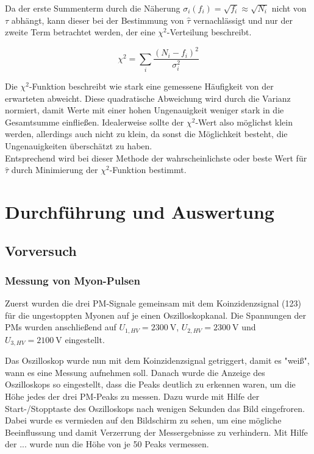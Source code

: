 \documentclass[slug=LM, room=Andreas-Schubert-Bau\,\ K\ 1A, supervisor=Anne-Sophie\ Berthold, coursedate=13.\ 12.\ 2019]{../../Lab_Report_LaTeX/lab_report}
\begin{document}
Da der erste Summenterm durch die Näherung \(\sigma_i(f_i) = \sqrt{f_i} \approx \sqrt{N_i}\) nicht
von \(\tau\) abhängt, kann dieser bei der Bestimmung von \(\hat{\tau}\) vernachlässigt und nur
der zweite Term betrachtet werden, der eine \(\chi^2\)-Verteilung beschreibt.

\begin{equation}\label{eq:chi}
 \chi^2 = \sum_{i} \frac{(N_i - f_i)^2}{\sigma_i^2}
\end{equation}

Die \(\chi^2\)-Funktion beschreibt wie stark eine gemessene Häufigkeit von der erwarteten abweicht.
Diese quadratische Abweichung wird durch die Varianz normiert, damit Werte mit einer hohen
Ungenauigkeit weniger stark in die Gesamtsumme einfließen. Idealerweise sollte der \(\chi^2\)-Wert
also möglichst klein werden, allerdings auch nicht zu klein, da sonst die Möglichkeit besteht, die
Ungenauigkeiten überschätzt zu haben.\\

Entsprechend wird bei dieser Methode der wahrscheinlichste oder beste Wert für \(\hat\tau\) durch
Minimierung der \(\chi^2\)-Funktion bestimmt.

\section{Durchf\"uhrung und Auswertung}
\label{sec:durchaus}

\subsection{Vorversuch}
\label{sec:vorvers}

\subsubsection{Messung von Myon-Pulsen}
\label{sec:pulse}

Zuerst wurden die drei PM-Signale gemeinsam mit dem Koinzidenzsignal
(123) für die ungestoppten Myonen auf je einen Oszilloskopkanal. Die
Spannungen der PMs wurden anschließend auf
\(U_{1,HV} = \SI{2300}{\volt}\), \(U_{2,HV} = \SI{2300}{\volt}\) und
\(U_{3,HV} = \SI{2100}{\volt}\) eingestellt.

Das Oszilloskop wurde nun mit dem Koinzidenzsignal getriggert, damit
es "weiß", wann es eine Messung aufnehmen soll.  Danach wurde die
Anzeige des Oszilloskops so eingestellt, dass die Peaks deutlich zu
erkennen waren, um die Höhe jedes der drei PM-Peaks zu messen. Dazu
wurde mit Hilfe der Start-/Stopptaste des Oszilloskops nach wenigen
Sekunden das Bild eingefroren. Dabei wurde es vermieden auf den
Bildschirm zu sehen, um eine mögliche Beeinflussung und damit
Verzerrung der Messergebnisse zu verhindern. Mit Hilfe der ... wurde
nun die Höhe von je 50 Peaks vermessen.
\end{document}
